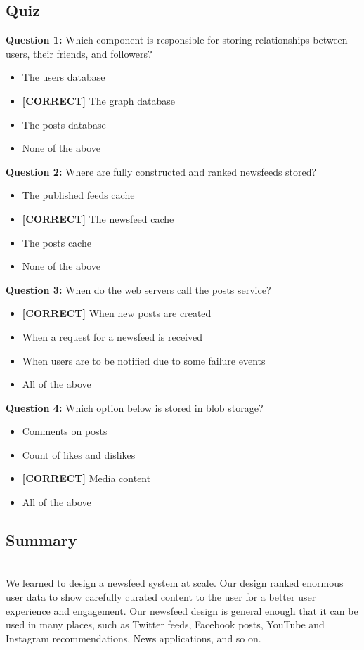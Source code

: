 \subsection*{Quiz}
\vspace{0.3cm}
\noindent
\textbf{Question 1:} Which component is responsible for storing relationships between users, their friends, and followers?
\\[0.2cm]
\begin{itemize}
 \item The users database
 \item \textbf{[CORRECT]} The graph database
 \item The posts database
 \item None of the above
\end{itemize}
\vspace{0.3cm}
\noindent
\textbf{Question 2:} Where are fully constructed and ranked newsfeeds stored?
\\[0.2cm]
\begin{itemize}
 \item The published feeds cache
 \item \textbf{[CORRECT]} The newsfeed cache
 \item The posts cache
 \item None of the above
\end{itemize}
\vspace{0.3cm}
\noindent
\textbf{Question 3:} When do the web servers call the posts service?
\\[0.2cm]
\begin{itemize}
 \item \textbf{[CORRECT]} When new posts are created
 \item When a request for a newsfeed is received
 \item When users are to be notified due to some failure events
 \item All of the above
\end{itemize}
\vspace{0.3cm}
\noindent
\textbf{Question 4:} Which option below is stored in blob storage?
\\[0.2cm]
\begin{itemize}
 \item Comments on posts
 \item Count of likes and dislikes
 \item \textbf{[CORRECT]} Media content
 \item All of the above
\end{itemize}

\subsection{Summary}\label{D2pyuSJpL7NBk-90cWEYI}
\\
We learned to design a newsfeed system at scale. Our design ranked enormous user data to show carefully curated content to the user for a better user experience and engagement. Our newsfeed design is general enough that it can be used in many places, such as Twitter feeds, Facebook posts, YouTube and Instagram recommendations, News applications, and so on.

